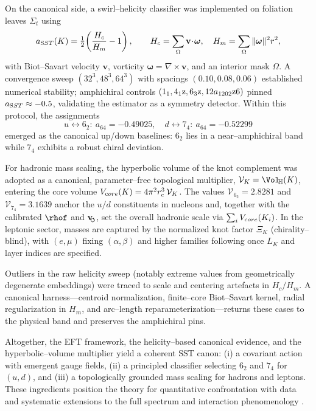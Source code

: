 \documentclass[11pt, preprint,titlepage]{revtex4-2}
\newcommand{\swirlarrow}{\!\!\scriptsize\boldsymbol{\circlearrowleft}}
\newcommand{\vswirl}{\mathbf{v}_{\swirlarrow}}
\begin{document}
    On the canonical side, a swirl–helicity classifier was implemented on foliation leaves \(\Sigma_t\) using
    \[
        a_{\textrm SST}(K)=\tfrac12\!\left(\frac{H_c}{H_m}-1\right),\qquad
        H_c=\sum_{\Omega}\mathbf v\!\cdot\!\boldsymbol\omega,\quad
        H_m=\sum_{\Omega}\|\boldsymbol\omega\|^2 r^2,
    \]
    with Biot–Savart velocity \(\mathbf v\), vorticity \(\boldsymbol{\omega}=\nabla\times\mathbf v\), and an interior mask \(\Omega\). A convergence sweep \((32^3,48^3,64^3)\) with spacings \((0.10,0.08,0.06)\) established numerical stability; amphichiral controls \((1_1,4_1{\textrm z},6_3{\textrm z},12a_{1202}\textrm{z6})\) pinned \(a_{\textrm SST}\approx-0.5\), validating the estimator as a symmetry detector. Within this protocol, the assignments
    \[
        u \leftrightarrow 6_2:\ a_{64}=-0.49025,\quad
        d \leftrightarrow 7_4:\ a_{64}=-0.52299
    \]
    emerged as the canonical up/down baselines: \(6_2\) lies in a near–amphichiral band while \(7_4\) exhibits a robust chiral deviation.

    For hadronic mass scaling, the hyperbolic volume of the knot complement was adopted as a canonical, parameter–free topological multiplier,
    \(\mathcal{V}_K=\Vol_{\!\mathbb{H}}(K)\), entering the core volume \(V_{\textrm core}(K)=4\pi^2 r_c^3\,\mathcal{V}_K\).
    The values \(\mathcal{V}_{6_2}=2.8281\) and \(\mathcal{V}_{7_4}=3.1639\) anchor the \(u/d\) constituents in nucleons and, together with the calibrated \(\rhof\) and \(\vswirl\), set the overall hadronic scale via \(\sum_i V_{\textrm core}(K_i)\).
    In the leptonic sector, masses are captured by the normalized knot factor \(\Xi_K\) (chirality–blind), with \((e,\mu)\) fixing \((\alpha,\beta)\) and higher families following once \(L_K\) and layer indices are specified.

    Outliers in the raw helicity sweep (notably extreme values from geometrically degenerate embeddings) were traced to scale and centering artefacts in \(H_c/H_m\). A canonical harness—centroid normalization, finite–core Biot–Savart kernel, radial regularization in \(H_m\), and arc–length reparameterization—returns these cases to the physical band and preserves the amphichiral pins.

    Altogether, the EFT framework, the helicity–based canonical evidence, and the hyperbolic–volume multiplier yield a coherent SST canon: (i) a covariant action with emergent gauge fields, (ii) a principled classifier selecting \(6_2\) and \(7_4\) for \((u,d)\), and (iii) a topologically grounded mass scaling for hadrons and leptons. These ingredients position the theory for quantitative confrontation with data and systematic extensions to the full spectrum and interaction phenomenology \cite{Barcelo2011,Volovik2003,Faddeev1997,Arnold1998}.
\end{document}
